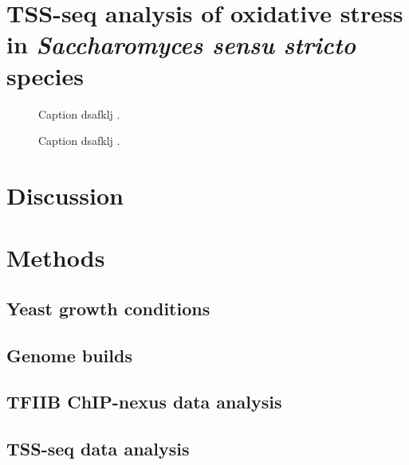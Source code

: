 \section{TSS-seq analysis of oxidative stress in \textit{Saccharomyces sensu stricto} species}

\lipsum[1]

\begin{figure}
    \caption[A figure showing TSS-seq coverage over oxidative-stress-induced TSSs in the three species.]{Caption dsafklj .}
\end{figure}

\begin{figure}
    \caption[A figure showing TSS-seq coverage over DSK2 in the three species, possibly with the corresponding northern blot.]{Caption dsafklj .}
\end{figure}

\section{Discussion}

\lipsum[1]

\section{Methods}

\subsection{Yeast growth conditions}

\subsection{Genome builds}

\subsection{TFIIB ChIP-nexus data analysis}

\subsection{TSS-seq data analysis}

